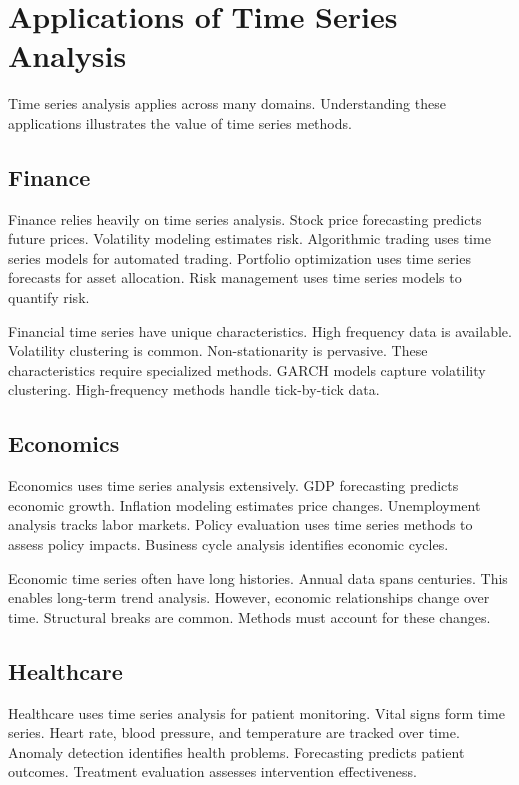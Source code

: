 \section{Applications of Time Series Analysis}

Time series analysis applies across many domains. Understanding these applications illustrates the value of time series methods.

\subsection{Finance}

Finance relies heavily on time series analysis. Stock price forecasting predicts future prices. Volatility modeling estimates risk. Algorithmic trading uses time series models for automated trading. Portfolio optimization uses time series forecasts for asset allocation. Risk management uses time series models to quantify risk.

Financial time series have unique characteristics. High frequency data is available. Volatility clustering is common. Non-stationarity is pervasive. These characteristics require specialized methods. GARCH models capture volatility clustering. High-frequency methods handle tick-by-tick data.

\subsection{Economics}

Economics uses time series analysis extensively. GDP forecasting predicts economic growth. Inflation modeling estimates price changes. Unemployment analysis tracks labor markets. Policy evaluation uses time series methods to assess policy impacts. Business cycle analysis identifies economic cycles.

Economic time series often have long histories. Annual data spans centuries. This enables long-term trend analysis. However, economic relationships change over time. Structural breaks are common. Methods must account for these changes.

\subsection{Healthcare}

Healthcare uses time series analysis for patient monitoring. Vital signs form time series. Heart rate, blood pressure, and temperature are tracked over time. Anomaly detection identifies health problems. Forecasting predicts patient outcomes. Treatment evaluation assesses intervention effectiveness.

